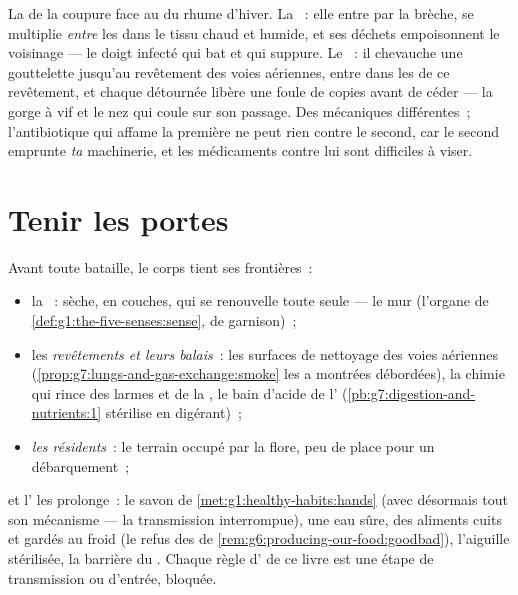 \begin{example}\label{ex:g9:microbes-and-infection:contrast}
La  de la coupure face au  du rhume d'hiver.
La ~: elle entre par la brèche, se multiplie
\emph{entre} les  dans le tissu chaud et humide, et
ses déchets empoisonnent le voisinage --- le doigt
infecté qui bat et qui suppure. Le ~: il chevauche une
gouttelette jusqu'au revêtement des voies aériennes, entre
dans les  de ce revêtement, et chaque 
détournée libère une foule de copies avant de céder --- la
gorge à vif et le nez qui coule sur son passage. Des
mécaniques différentes~; l'antibiotique qui affame la
première ne peut rien contre le second, car le second
emprunte \emph{ta} machinerie, et les médicaments contre lui
sont difficiles à viser.
\end{example}

\section{Tenir les portes}

\begin{proposition}\label{prop:g9:microbes-and-infection:doors}
Avant toute bataille, le corps tient ses frontières~:
\begin{itemize}
  \item la \emph{}~: sèche, en couches, qui se
        renouvelle toute seule --- le mur (l'organe de
        \cref{def:g1:the-five-senses:sense}, de garnison)~;
  \item les \emph{revêtements et leurs balais}~: les
        surfaces de nettoyage des voies aériennes
        (\cref{prop:g7:lungs-and-gas-exchange:smoke} les a
        montrées débordées), la chimie qui rince des larmes
        et de la , le bain d'acide de l'
        (\cref{pb:g7:digestion-and-nutrients:1} stérilise en
        digérant)~;
  \item \emph{les résidents}~: le terrain occupé par la
        flore, peu de place pour un débarquement~;
\end{itemize}
et l' les prolonge~: le savon de
\cref{met:g1:healthy-habits:hands} (avec désormais tout son
mécanisme --- la transmission interrompue), une eau sûre,
des aliments cuits et gardés au froid (le refus des
 de \cref{rem:g6:producing-our-food:goodbad}),
l'aiguille stérilisée, la barrière du . Chaque
règle d' de ce livre est une étape de transmission ou
d'entrée, bloquée.
\end{proposition}
\admitted

